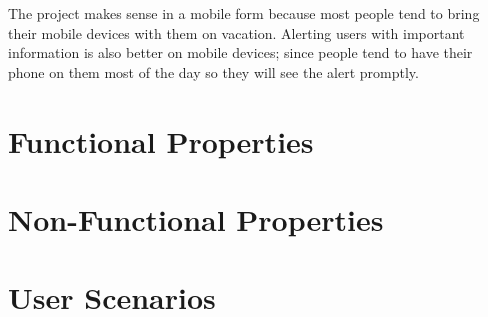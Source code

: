 \documentclass[12pt]{article}
\begin{document}
The project makes sense in a mobile form because most people tend to bring their mobile devices with them on vacation.
Alerting users with important information is also better on mobile devices;
since people tend to have their phone on them most of the day so they will see the alert promptly.

\section*{Functional Properties}

\section*{Non-Functional Properties}

\section*{User Scenarios}
\end{document}
